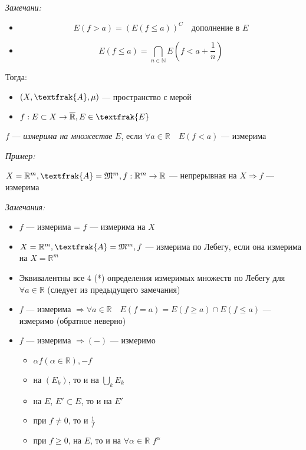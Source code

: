 \documentclass{article}
\def\dbl{\,\,}
\begin{document}
\textit{Замечани: }

\begin{itemize}
    \item \[E(f > a) = (E(f \le a))^{C} \quad \text{дополнение в }E\]
    \item \[E(f \le a) = \bigcap_{n \in \mathbb{N}} E(f < a + \frac{1}{n})\]
\end{itemize}

Тогда: 

\begin{itemize}
    \item $(X, \textfrak{A}, \mu)$ --- пространство с мерой
    \item $f: E \subset X \rightarrow \overline{\mathbb{R}}, E \in \textfrak{E}$
\end{itemize}

$f$ --- \textit{измерима на множестве} $E$, если $\forall a \in \mathbb{R} \quad E(f < a)$ --- измерима

\textit{Пример:}

$X = \mathbb{R}^m, \textfrak{A} = \mathfrak{M}^m, f: \mathbb{R}^m \rightarrow \mathbb{R}$ --- непрерывная на $X \Rightarrow f$ --- измерима

\textit{Замечания: }

\begin{itemize}
    \item $f$ --- измерима = $f$ --- измерима на $X$
    \item $X = \mathbb{R}^m, \textfrak{A} = \mathfrak{M}^m, f$ --- измерима по Лебегу, если она измерима на $X = \mathbb{R}^m$
    \item Эквивалентны все 4 (*) определения измеримых множеств по Лебегу для $\forall a \in \mathbb{R}$ (следует из предыдущего замечания)
    \item $f$ --- измерима $\Rightarrow \forall a \in \mathbb{R} \quad E(f = a) = E(f \ge a) \cap E(f \le a)$ --- измеримо (обратное неверно)
    \item $f$ --- измерима $\Rightarrow (-)$ --- измеримо   
        \begin{itemize}
            \item $\alpha f (\alpha \in \mathbb{R}), -f$
            \item на $(E_k)$, то и на $\bigcup_{k} E_k$
            \item на $E$, $E' \subset E$, то и на $E'$
            \item при $f \neq 0$, то и $\frac{1}{f}$
            \item при $f \ge 0$, на $E$, то и на $\forall \alpha \in \mathbb{R} \dbl f^{\alpha}$
        \end{itemize}
\end{itemize}
\end{document}

